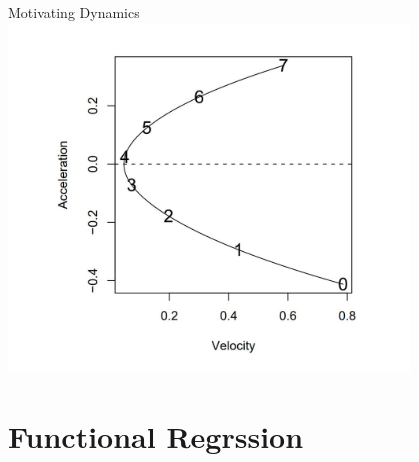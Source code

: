 \documentclass[hyperref={pdfpagelabels=false}]{beamer}
\begin{document}
\begin{frame}{Motivating Dynamics}
\center
\includegraphics[width=0.8\textwidth]{phase_plane}
\end{frame}

%
%


    
\section{Functional Regrssion}
    
\end{document}
